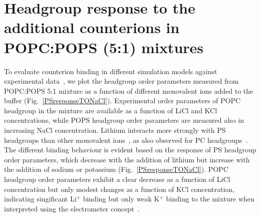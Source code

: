 \documentclass[journal=jpcbfk,manuscript=article]{achemso}
\begin{document}
\section{Headgroup response to the additional counterions in POPC:POPS (5:1) mixtures}\label{mixtureTOadditionalCIs}
To evaluate counterion binding in different simulation models against experimental data~\cite{roux90},
we plot the headgroup order parameters measured from POPC:POPS 5:1 mixture
as a function of different monovalent ions added to the buffer (Fig.~\ref{PSresponseTONaCl}). 
Experimental order parameters of POPC headgroup in the mixture are available as a function
of LiCl and KCl concentrations, while POPS headgroup order parameters are measured also
in increasing NaCl concentration. Lithium interacts more strongly with PS headgroups than other monovalent 
ions~\cite{hauser83,hauser85,roux86,mattai89,roux90}, as also observed for PC headgroups~\cite{cevc90}. 
The different binding behaviour is evident based on the response of PS headgroup order parameters, which decrease with the addition of lithium 
but increase with the addition of sodium or potassium (Fig.~\ref{PSresponseTONaCl}). 
POPC headgroup order parameters exhibit a clear decrease as a function of LiCl concentration
but only modest changes as a function of KCl concentration, indicating singificant 
Li$^+$ binding but only weak K$^+$ binding to the mixture when interpreted using the
electrometer concept~\cite{akutsu81,altenbach84,seelig87}.
\end{document}
